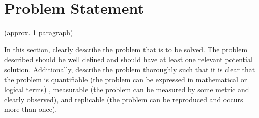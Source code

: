 \section{Problem Statement}
(approx. 1 paragraph)

	In this section, clearly describe the problem that is to be solved. The problem described should be well defined and should have at least one relevant potential solution. Additionally, describe the problem thoroughly such that it is clear that the problem is quantifiable (the problem can be expressed in mathematical or logical terms) , measurable (the problem can be measured by some metric and clearly observed), and replicable (the problem can be reproduced and occurs more than once).